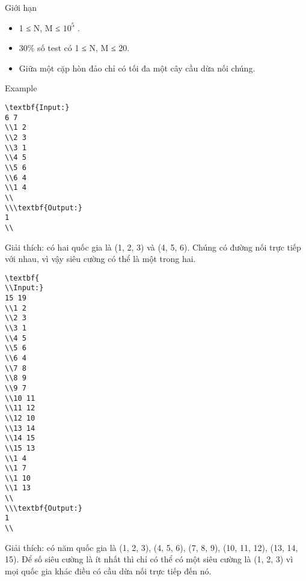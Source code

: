 Giới hạn
\begin{itemize}
	\item     1 ≤ N, M ≤ $10^{5}$    .   
	\item     30\% số test có 1 ≤ N, M ≤ 20.   
	\item     Giữa một cặp hòn đảo chỉ có tối đa một cây cầu dừa nối chúng.   
\end{itemize}
Example
\begin{verbatim}
\textbf{Input:}
6 7
\\1 2
\\2 3
\\3 1
\\4 5
\\5 6
\\6 4
\\1 4
\\
\\\textbf{Output:}
1
\\\end{verbatim}

Giải thích: có hai quốc gia là (1, 2, 3) và (4, 5, 6). Chúng có đường nối trực tiếp với nhau, vì vậy siêu cường có thể là một trong hai.
\begin{verbatim}
\textbf{
\\Input:}
15 19
\\1 2
\\2 3
\\3 1
\\4 5
\\5 6
\\6 4
\\7 8
\\8 9
\\9 7
\\10 11
\\11 12
\\12 10
\\13 14
\\14 15
\\15 13
\\1 4
\\1 7
\\1 10
\\1 13
\\
\\\textbf{Output:}
1
\\\end{verbatim}

Giải thích: có năm quốc gia là (1, 2, 3), (4, 5, 6), (7, 8, 9), (10, 11, 12), (13, 14, 15). Để số siêu cường là ít nhất thì chỉ có thể có một siêu cường là (1, 2, 3) vì mọi quốc gia khác điều có cầu dừa nối trực tiếp đến nó.